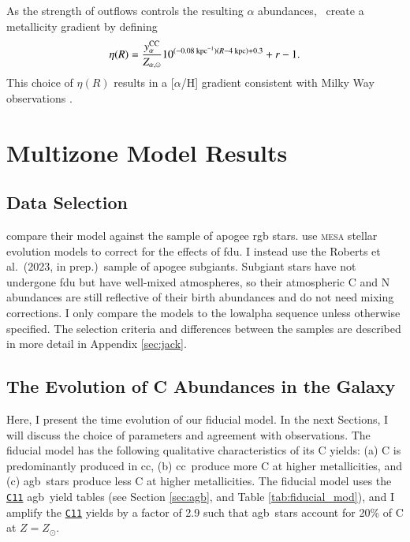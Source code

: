 \documentclass[12pt,oneside,letterpaper]{report}
\newcommand{\cc}{\gls{cc}}
\newcommand{\agb}{\gls{agb}}
\newcommand{\apogee}{\gls{apogee}}
\newcommand{\citetjack}{Roberts et al.~(2023, in prep.)}
\newcommand{\cxi}{\texttt{\hyperlink{C11}{C11}}}
\newcommand{\JJ}{\citetalias{james+21}}
\begin{document}
As the strength of outflows controls the resulting $\alpha$ abundances, \JJ~create a metallicity gradient by defining
\begin{equation}\label{eq:eta_r}
\eta(R) = \frac{y_{\alpha}^{\rm CC}}{Z_{\alpha, \odot}} 10^{(-0.08\text{ kpc}^{-1})(R-4\text{ kpc})+0.3} + r - 1.
\end{equation}
This choice of $\eta(R)$ results in a [$\alpha$/H] gradient consistent with Milky Way observations \citep[e.g.][]{hayden+14, weinberg+19, frinchaboy+13}.


\chapter{Multizone Model Results}
\section{Data Selection}

\citet{james+23} compare their model against the \cite{vincenzo+21} sample of \apogee{} \citep{apogee17} \gls{rgb} stars. \citet{vincenzo+21} use \textsc{mesa} stellar evolution models \citep{mesa} to correct for the effects of \gls{fdu}. 
I instead use the \citetjack~sample of \apogee{} \gls{subgiant}s. Subgiant stars have not undergone \gls{fdu} but have well-mixed atmospheres, so their atmospheric C and N abundances are still reflective of their birth abundances and do not need mixing corrections. I only compare the models to the \gls{lowalpha} sequence unless otherwise specified.  The selection criteria and differences between the samples are described in more detail in Appendix \ref{sec:jack}.



\section{The Evolution of C Abundances in the Galaxy}

Here, I present the time evolution of our fiducial model. In the next Sections, I will discuss the choice of parameters and agreement with observations. 
The fiducial model has the following qualitative characteristics of its C yields: (a) C is predominantly produced in \cc, (b) \cc\ produce more C at higher metallicities, and (c) \agb\ stars produce less C at higher metallicities. The fiducial model uses the \cxi{} \agb\ yield tables (see Section \ref{sec:agb}, and Table \ref{tab:fiducial_mod}), and I amplify the \cxi{} yields by a factor of 2.9 such that \agb\ stars account for 20\% of C at $Z=Z_\odot$. 
\end{document}
